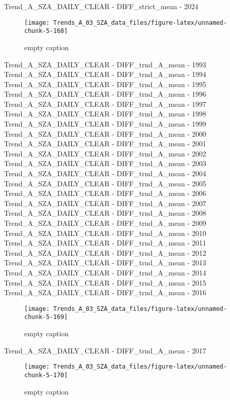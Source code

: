 \documentclass[
  10pt,
  a4paper,oneside]{article}
\begin{document}
Trend\_A\_SZA\_DAILY\_CLEAR - DIFF\_strict\_mean - 2024

\begin{figure}[!ht]

{\centering \texttt{[image: Trends\_A\_03\_SZA\_data\_files/figure-latex/unnamed-chunk-5-168]} 

}

\caption{ empty caption }\label{fig:unnamed-chunk-5-168}
\end{figure}

Trend\_A\_SZA\_DAILY\_CLEAR - DIFF\_trnd\_A\_mean - 1993
Trend\_A\_SZA\_DAILY\_CLEAR - DIFF\_trnd\_A\_mean - 1994
Trend\_A\_SZA\_DAILY\_CLEAR - DIFF\_trnd\_A\_mean - 1995
Trend\_A\_SZA\_DAILY\_CLEAR - DIFF\_trnd\_A\_mean - 1996
Trend\_A\_SZA\_DAILY\_CLEAR - DIFF\_trnd\_A\_mean - 1997
Trend\_A\_SZA\_DAILY\_CLEAR - DIFF\_trnd\_A\_mean - 1998
Trend\_A\_SZA\_DAILY\_CLEAR - DIFF\_trnd\_A\_mean - 1999
Trend\_A\_SZA\_DAILY\_CLEAR - DIFF\_trnd\_A\_mean - 2000
Trend\_A\_SZA\_DAILY\_CLEAR - DIFF\_trnd\_A\_mean - 2001
Trend\_A\_SZA\_DAILY\_CLEAR - DIFF\_trnd\_A\_mean - 2002
Trend\_A\_SZA\_DAILY\_CLEAR - DIFF\_trnd\_A\_mean - 2003
Trend\_A\_SZA\_DAILY\_CLEAR - DIFF\_trnd\_A\_mean - 2004
Trend\_A\_SZA\_DAILY\_CLEAR - DIFF\_trnd\_A\_mean - 2005
Trend\_A\_SZA\_DAILY\_CLEAR - DIFF\_trnd\_A\_mean - 2006
Trend\_A\_SZA\_DAILY\_CLEAR - DIFF\_trnd\_A\_mean - 2007
Trend\_A\_SZA\_DAILY\_CLEAR - DIFF\_trnd\_A\_mean - 2008
Trend\_A\_SZA\_DAILY\_CLEAR - DIFF\_trnd\_A\_mean - 2009
Trend\_A\_SZA\_DAILY\_CLEAR - DIFF\_trnd\_A\_mean - 2010
Trend\_A\_SZA\_DAILY\_CLEAR - DIFF\_trnd\_A\_mean - 2011
Trend\_A\_SZA\_DAILY\_CLEAR - DIFF\_trnd\_A\_mean - 2012
Trend\_A\_SZA\_DAILY\_CLEAR - DIFF\_trnd\_A\_mean - 2013
Trend\_A\_SZA\_DAILY\_CLEAR - DIFF\_trnd\_A\_mean - 2014
Trend\_A\_SZA\_DAILY\_CLEAR - DIFF\_trnd\_A\_mean - 2015
Trend\_A\_SZA\_DAILY\_CLEAR - DIFF\_trnd\_A\_mean - 2016

\begin{figure}[!ht]

{\centering \texttt{[image: Trends\_A\_03\_SZA\_data\_files/figure-latex/unnamed-chunk-5-169]} 

}

\caption{ empty caption }\label{fig:unnamed-chunk-5-169}
\end{figure}

Trend\_A\_SZA\_DAILY\_CLEAR - DIFF\_trnd\_A\_mean - 2017

\begin{figure}[!ht]

{\centering \texttt{[image: Trends\_A\_03\_SZA\_data\_files/figure-latex/unnamed-chunk-5-170]} 

}

\caption{ empty caption }\label{fig:unnamed-chunk-5-170}
\end{figure}
\end{document}
